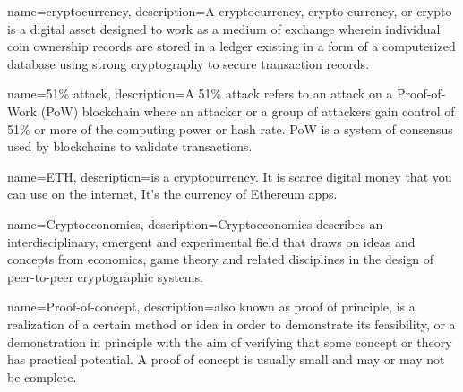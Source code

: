 \makeglossaries
 
{
    name=cryptocurrency,
    description={A cryptocurrency, crypto-currency, or crypto is a digital asset designed to work as a medium of exchange wherein individual coin ownership records are stored in a ledger existing in a form of a computerized database using strong cryptography to secure transaction records.}
}

{
    name=51\% attack,
    description={A 51\% attack refers to an attack on a Proof-of-Work (PoW) blockchain where an attacker or a group of attackers gain control of 51\% or more of the computing power or hash rate. PoW is a system of consensus used by blockchains to validate transactions.}
}

{
    name=ETH,
    description={is a cryptocurrency. It is scarce digital money that you can use on the internet, It's the currency of Ethereum apps.}
}

{
    name=Cryptoeconomics,
    description={Cryptoeconomics describes an interdisciplinary, emergent and experimental field that draws on ideas and concepts from economics, game theory and related disciplines in the design of peer-to-peer cryptographic systems.}
}

{
    name=Proof-of-concept,
    description={also known as proof of principle, is a realization of a certain method or idea in order to demonstrate its feasibility, or a demonstration in principle with the aim of verifying that some concept or theory has practical potential. A proof of concept is usually small and may or may not be complete.}
}